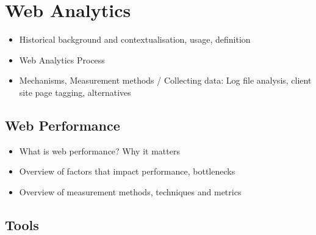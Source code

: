 









\section{Web Analytics}

\begin{itemize}
\item Historical background and contextualisation, usage, definition
\item Web Analytics Process
\item Mechanisms, Measurement methods / Collecting data: Log file analysis, client site page tagging, alternatives
\end{itemize}









\subsection{Web Performance}

\begin{itemize}
\item What is web performance? Why it matters
\item Overview of factors that impact performance, bottlenecks
\item Overview of measurement methods, techniques and metrics
\end{itemize}







\subsection{Tools}

